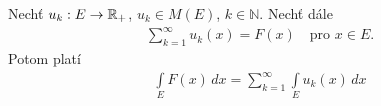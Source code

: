 %
%
%
%

\begin{theorem}[Tonelli]
\label{v_2.11_Tonelli}
Nechť $u_k:E \to \mathbb{R}_+$, $u_k \in M(E)$, $k \in \mathbb{N}$. Nechť dále
\begin{align*}
\sum \limits _{k=1}^{\infty} u_k(x)=F(x) \quad \text{pro $x \in E$.}
\end{align*}
Potom platí
\begin{align*}
\int \limits _E F(x) \, dx=\sum \limits _{k=1}^{\infty} \int \limits _E u_k(x) \,dx
\end{align*}
\end{theorem}

